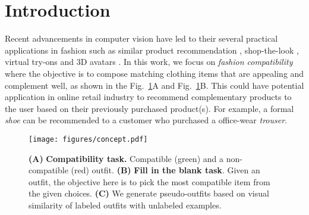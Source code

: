 \documentclass[sigconf]{acmart}
\begin{document}


\maketitle

\section{Introduction}
Recent advancements in computer vision have led to their several practical applications in fashion such as similar product recommendation \cite{lu2019learning,cvpr2020fashion,tangseng2020toward,tangseng2020reco}, shop-the-look \cite{hadi2015buy,liu2012street}, virtual try-ons \cite{neuberger2020image,yang2020towards} and 3D avatars \cite{ma2020learning,patel2020tailornet}. In this work, we focus on {\em fashion compatibility} where the objective is to compose matching clothing items that are appealing and complement well, as shown in the Fig.~\ref{fig:concept_fig}{A} and Fig.~\ref{fig:concept_fig}{B}. This could have potential application in online retail industry to recommend complementary products to the user based on their previously purchased product(s). For example, a formal {\em shoe} can be recommended to a customer who purchased a office-wear {\em trouser}.

\begin{figure}[t]
    \centering
    \texttt{[image: figures/concept.pdf]}
    \caption{\textbf{(A)} \textbf{Compatibility task.} Compatible (green) and a non-compatible (red) outfit. \textbf{(B)} {\bf Fill in the blank task}. Given an outfit, the objective here is to pick the most compatible item from the given choices. \textbf{(C)} We generate pseudo-outfits based on visual similarity of labeled outfits with unlabeled examples.}
    \label{fig:concept_fig}
\end{figure}
\vspace{1mm}
\end{document}
